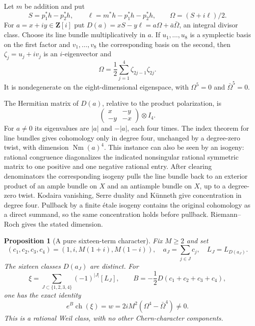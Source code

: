 \documentclass[11pt]{article}
\newtheorem{proposition}[theorem]{Proposition}
\theoremstyle{definition}
\theoremstyle{remark}
\newcommand{\Z}{\mathbf Z}
\newcommand{\Nm}{\operatorname{Nm}}
\begin{document}
Let $m$ be addition and put
\[
 S=p_1^*h-p_2^*h,\qquad
 \ell=m^*h-p_1^*h-p_2^*h,\qquad
 \Omega=(S+i\ell)/2.
\]
For $a=x+iy\in\Z[i]$ put $D(a)=xS-y\ell=a\Omega+\bar a\bar\Omega$, an integral divisor class. Choose its line bundle multiplicatively in $a$. If $u_1,\ldots,u_8$ is a symplectic basis on the first factor and $v_1,\ldots,v_8$ the corresponding basis on the second, then $\zeta_j=u_j+iv_j$ is an $i$-eigenvector and
\[
 \Omega=\frac12\sum_{j=1}^4\zeta_{2j-1}\zeta_{2j}.
\]
It is nondegenerate on the eight-dimensional eigenspace, with $\Omega^5=0$ and $\bar\Omega^5=0$.

The Hermitian matrix of $D(a)$, relative to the product polarization, is
\[
 \begin{pmatrix}x&-y\\-y&-x\end{pmatrix}\otimes I_4.
\]
For $a\ne0$ its eigenvalues are $|a|$ and $-|a|$, each four times. The index theorem for line bundles gives cohomology only in degree four, unchanged by a degree-zero twist, with dimension $\Nm(a)^4$. This instance can also be seen by an isogeny: rational congruence diagonalizes the indicated nonsingular rational symmetric matrix to one positive and one negative rational entry. After clearing denominators the corresponding isogeny pulls the line bundle back to an exterior product of an ample bundle on $X$ and an antiample bundle on $X$, up to a degree-zero twist. Kodaira vanishing, Serre duality and K\"unneth give concentration in degree four. Pullback by a finite \'etale isogeny contains the original cohomology as a direct summand, so the same concentration holds before pullback. Riemann--Roch gives the stated dimension.

\begin{proposition}[A pure sixteen-term character]\label{prop:sixteen-line-character}
Fix $M\ge2$ and set
\[
 (c_1,c_2,c_3,c_4)=(1,i,M(1+i),M(1-i)),
 \quad a_J=\sum_{j\in J}c_j,\quad L_J=L_{D(a_J)}.
\]
The sixteen classes $D(a_J)$ are distinct. For
\[
 \xi=\sum_{J\subset\{1,2,3,4\}}(-1)^{|J|}[L_J],
 \qquad B=-\frac12D(c_1+c_2+c_3+c_4),
\]
one has the exact identity
\[
 e^B\operatorname{ch}(\xi)
   =w=2iM^2(\Omega^4-\bar\Omega^4)\ne0.
\]
This is a rational Weil class, with no other Chern-character components.
\end{proposition}
\end{document}
